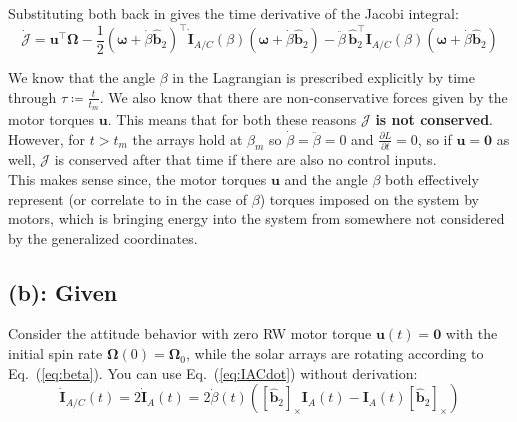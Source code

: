 \documentclass[titlepage]{article}
\begin{document}
\newpage

\begin{mdframed}
	Substituting both back in gives the time derivative of the Jacobi integral:
	\begin{equation}
		\dot{\mathcal{J}}=\boldsymbol{u}^\top\boldsymbol{\Omega}-\frac{1}{2}\left(\boldsymbol{\omega}+\dot{\beta}\hat{\boldsymbol{b}}_2\right)^\top\dot{\boldsymbol{I}}_{A/C}(\beta)\left(\boldsymbol{\omega}+\dot{\beta}\hat{\boldsymbol{b}}_2\right)-\ddot{\beta}\,\hat{\boldsymbol{b}}_2^\top\boldsymbol{I}_{A/C}(\beta)\left(\boldsymbol{\omega}+\dot{\beta}\hat{\boldsymbol{b}}_2\right)
		\label{eq:jacobidot}
	\end{equation}
	
	We know that the angle $\beta$ in the Lagrangian is prescribed explicitly by time through $\tau\coloneqq\frac{t}{t_m}$. We also know that there are non-conservative forces given by the motor torques $\boldsymbol{u}$. This means that for both these reasons $\mathcal{J}$ \textbf{is not conserved}.\\
	
	However, for $t>t_m$ the arrays hold at $\beta_m$ so $\dot{\beta}=\ddot{\beta}=0$ and $\frac{\partial L}{\partial t}=0$, so if $\boldsymbol{u}=\boldsymbol{0}$ as well, $\mathcal{J}$ is conserved after that time if there are also no control inputs.\\
	
	This makes sense since, the motor torques $\boldsymbol{u}$ and the angle $\beta$ both effectively represent (or correlate to in the case of $\beta$) torques imposed on the system by motors, which is bringing energy into the system from somewhere not considered by the generalized coordinates.
\end{mdframed}

\newpage

\subsection*{(b): Given}

Consider the attitude behavior with zero RW motor torque $\boldsymbol{u}(t)=\boldsymbol{0}$ with the initial spin rate $\boldsymbol{\Omega}(0)=\boldsymbol{\Omega}_0$, while the solar arrays are rotating according to Eq.~(\ref{eq:beta}). You can use Eq.~(\ref{eq:IACdot}) without derivation:
\begin{equation}
	\dot{\boldsymbol{I}}_{A/C}(t)=2\dot{\boldsymbol{I}}_A(t)=2\dot{\beta}(t)\left(\left[\hat{\boldsymbol{b}}_2\right]_\times\boldsymbol{I}_A(t)-\boldsymbol{I}_A(t)\left[\hat{\boldsymbol{b}}_2\right]_\times\right)
	\label{eq:IACdot}
\end{equation}
\end{document}
